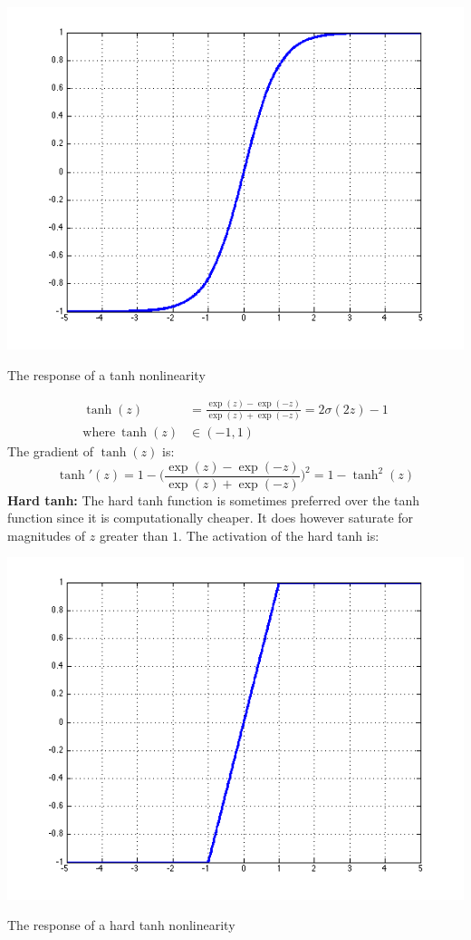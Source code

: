 \documentclass{tufte-handout}
\begin{document}
\begin{marginfigure}%
  \includegraphics[width=\linewidth]{graph_tanh}
  \caption{The response of a tanh nonlinearity}
  \label{fig:graph_tanh}
\end{marginfigure}
\begin{align*}
  \operatorname{tanh}(z) &=  \frac{\operatorname{exp}(z) - \operatorname{exp}(-z)}{\operatorname{exp}(z) + \operatorname{exp}(-z)} = 2\sigma(2z) - 1\\
  \text{where}~\operatorname{tanh}(z) &\in (-1, 1)
\end{align*}
The gradient of $ \operatorname{tanh}(z) $ is:
$$ \operatorname{tanh}'(z) = 1 - \bigg(\frac{\operatorname{exp}(z) - \operatorname{exp}(-z)}{\operatorname{exp}(z) + \operatorname{exp}(-z)}\bigg)^2 = 1 - \operatorname{tanh}^2(z)$$
\textbf{Hard tanh:}
The hard tanh function is sometimes preferred over the tanh function since it is computationally cheaper. It does however saturate for magnitudes of $z$ greater than $1$. The activation of the hard tanh is:
\begin{marginfigure}%
  \includegraphics[width=\linewidth]{graph_hardtanh}
  \caption{The response of a hard tanh nonlinearity}
  \label{fig:graph_hardtanh}
\end{marginfigure}
\end{document}

